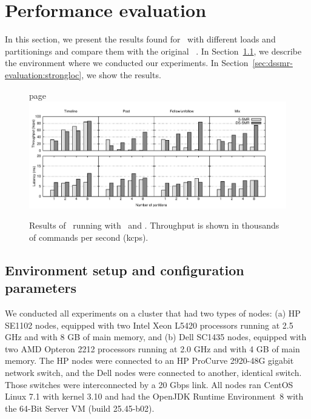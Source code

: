 \section{Performance evaluation}
\label{sec:dssmr-experiments}

In this section, we present the results found for \dssmrappname\ with different loads
and partitionings and compare them with the original
\ssmr{}~\cite{bezerra2014ssmr}.
In Section~\ref{sec:dssmr-evaluation:setup}, we describe the environment where we
conducted our experiments. In Section~\ref{sec:dssmr-evaluation:strongloc}, we show
the results.

\begin{figure}
\begin{minipage}[b]{1\linewidth} %
page
\centering
      \includegraphics[width=1.08\linewidth]{figures/experiments/dssmr/strong-locality}
\end{minipage}
\caption{Results of \dssmrappname\ running with \ssmr\ and \dssmr{}. Throughput is shown in thousands of commands per second (kcps).}
\label{fig:strongloc}
\end{figure}

\subsection{Environment setup and configuration parameters}
\label{sec:dssmr-evaluation:setup}

We conducted all experiments on a cluster that had two types of nodes: (a) HP
SE1102 nodes, equipped with two Intel Xeon L5420 processors running at 2.5 GHz
and with 8 GB of main memory, and (b) Dell SC1435 nodes, equipped with two AMD
Opteron 2212 processors running at 2.0 GHz and with 4 GB of main memory. The HP
nodes were connected to an HP ProCurve 2920-48G gigabit network switch, and the
Dell nodes were connected to another, identical switch. Those switches were
interconnected by a 20 Gbps link. All nodes ran CentOS Linux 7.1 with kernel
3.10 and had the OpenJDK Runtime Environment~8 with the \mbox{64-Bit} Server VM
(build 25.45-b02).

